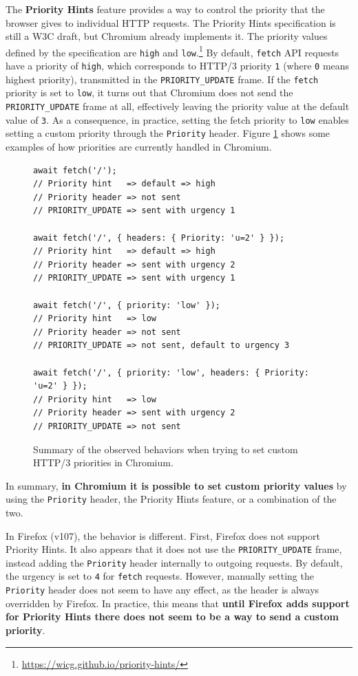 The \textbf{Priority Hints} feature provides a way to control the priority that the browser gives to individual HTTP requests. The Priority Hints specification is still a W3C draft, but Chromium already implements it. The priority values defined by the specification are \texttt{high} and \texttt{low}.\footnote{\url{https://wicg.github.io/priority-hints/}} By default, \texttt{fetch} API requests have a priority of \texttt{high}, which corresponds to HTTP/3 priority \texttt{1} (where \texttt{0} means highest priority), transmitted in the \texttt{PRIORITY\_UPDATE} frame. If the \texttt{fetch} priority is set to \texttt{low}, it turns out that Chromium does not send the \texttt{PRIORITY\_UPDATE} frame at all, effectively leaving the priority value at the default value of \texttt{3}. As a consequence, in practice, setting the fetch priority to \texttt{low} enables setting a custom priority through the \texttt{Priority} header. Figure \ref{fig:chromium_fetch} shows some examples of how priorities are currently handled in Chromium.

\begin{figure}[h]
    \centering
    \begin{verbatim}
await fetch('/');
// Priority hint   => default => high
// Priority header => not sent
// PRIORITY_UPDATE => sent with urgency 1

await fetch('/', { headers: { Priority: 'u=2' } });
// Priority hint   => default => high
// Priority header => sent with urgency 2
// PRIORITY_UPDATE => sent with urgency 1

await fetch('/', { priority: 'low' });
// Priority hint   => low
// Priority header => not sent
// PRIORITY_UPDATE => not sent, default to urgency 3

await fetch('/', { priority: 'low', headers: { Priority: 'u=2' } });
// Priority hint   => low
// Priority header => sent with urgency 2
// PRIORITY_UPDATE => not sent
    \end{verbatim}
    \caption{Summary of the observed behaviors when trying to set custom HTTP/3 priorities in Chromium.}
    \label{fig:chromium_fetch}
\end{figure}

In summary, \textbf{in Chromium it is possible to set custom priority values} by using the \texttt{Priority} header, the Priority Hints feature, or a combination of the two.

In Firefox (v107), the behavior is different. First, Firefox does not support Priority Hints. It also appears that it does not use the \texttt{PRIORITY\_UPDATE} frame, instead adding the \texttt{Priority} header internally to outgoing requests. By default, the urgency is set to \texttt{4} for \texttt{fetch} requests. However, manually setting the \texttt{Priority} header does not seem to have any effect, as the header is always overridden by Firefox. In practice, this means that \textbf{until Firefox adds support for Priority Hints there does not seem to be a way to send a custom priority}.

